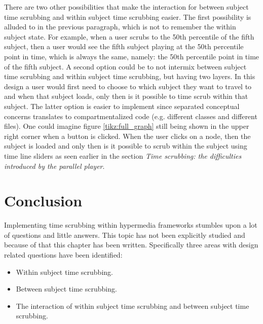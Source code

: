 There are two other possibilities that make the interaction for between subject time scrubbing and within subject time scrubbing easier. The first possibility is alluded to in the previous paragraph, which is not to remember the within subject state. For example, when a user scrubs to the 50th percentile of the fifth subject, then a user would see the fifth subject playing at the 50th percentile point in time, which is always the same, namely: the 50th percentile point in time of the fifth subject. A second option could be to not intermix between subject time scrubbing and within subject time scrubbing, but having two layers. In this design a user would first need to choose to which subject they want to travel to and when that subject loads, only then is it possible to time scrub within that subject. The latter option is easier to implement since separated conceptual concerns translates to compartmentalized code (e.g. different classes and different files). One could imagine figure \ref{tikz:full_graph} still being shown in the upper right corner when a button is clicked. When the user clicks on a node, then the subject is loaded and only then is it possible to scrub within the subject using time line sliders as seen earlier in the section \textit{Time scrubbing: the difficulties introduced by the parallel player}.

\section{Conclusion}
Implementing time scrubbing within hypermedia frameworks stumbles upon a lot of questions and little answers. This topic has not been explicitly studied and because of that this chapter has been written. Specifically three areas with design related questions have been identified:
\begin{itemize}
    \item Within subject time scrubbing.
    \item Between subject time scrubbing.
    \item The interaction of within subject time scrubbing and between subject time scrubbing.
\end{itemize}

